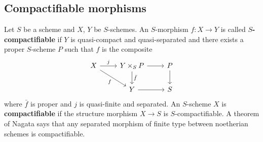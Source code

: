 \subsection{Compactifiable morphisms}
Let $S$ be a scheme and $X$, $Y$ be $S$-schemes. An $S$-morphism $f:X\to Y$ is called \textbf{$S$-compactifiable} if $Y$ is quasi-compact and quasi-separated and there exists a proper $S$-scheme $P$ such that $f$ is the composite
\[\begin{tikzcd}
X\ar[r,"j"]\ar[rd,swap,"f"]&Y\times_SP\ar[r]\ar[d,"\bar{f}"]&P\ar[d]\\
&Y\ar[r]&S
\end{tikzcd}\]
where $\bar{f}$ is proper and $j$ is quasi-finite and separated. An $S$-scheme $X$ is \textbf{compactifiable} if the structure morphism $X\to S$ is $S$-compactifiable. A theorem of Nagata says that any separated morphism of finite type between noetherian schemes is compactifiable.


